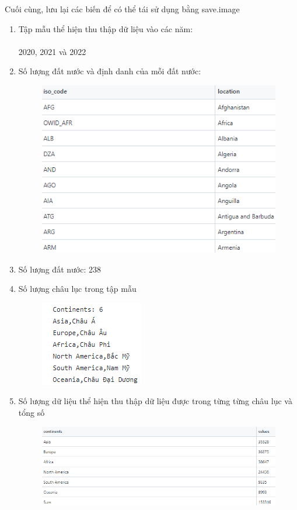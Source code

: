 \documentclass[a4paper]{article}
\theoremstyle{definition}
\begin{document}
\begin{enumerate}[i)]
\begin{itemize}
        \end{itemize}
    Cuối cùng, lưu lại các biến để có thể tái sử dụng bằng save.image
			\begin{enumerate}[1)]
				\item Tập mẫu thể hiện thu thập dữ liệu vào các năm:\\
				\\
				2020, 2021 và 2022
				\\
				\item Số lượng đất nước và định danh của mỗi đất nước:
				\begin{figure}[H]
					\centering
					\includegraphics{images/1.2.png}
				\end{figure}
				\item Số lượng đất nước: 238
				\\
				\item Số lượng châu lục trong tập mẫu
					\begin{figure}[H]
						\centering
						\includegraphics{images/1.3.png}
					\end{figure}
			\item Số lượng dữ liệu thể hiện thu thập dữ liệu được trong từng từng châu lục và tổng số
			\begin{figure}[H]
				\centering
				\includegraphics[scale=0.8]{images/1.4.png}

\end{figure}
\end{enumerate}
\end{enumerate}
\end{document}
